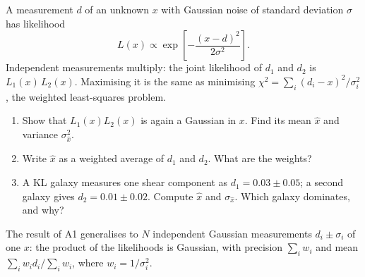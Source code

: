 
\begin{given}
A measurement $d$ of an unknown $x$ with Gaussian noise of standard deviation $\sigma$ has likelihood
\[
L(x) \propto \exp\!\left[-\frac{(x-d)^2}{2\sigma^2}\right].
\]
Independent measurements multiply: the joint likelihood of $d_1$ and $d_2$ is $L_1(x)\,L_2(x)$. Maximising it is the
same as minimising $\chi^2 = \sum_i (d_i - x)^2/\sigma_i^2$, the weighted least-squares problem.
\end{given}


\begin{enumerate}
  \item Show that $L_1(x)L_2(x)$ is again a Gaussian in $x$. Find its mean $\hat x$ and variance $\sigma_{\hat x}^2$.
  \item Write $\hat x$ as a weighted average of $d_1$ and $d_2$. What are the weights?
  \item A KL galaxy measures one shear component as $d_1 = 0.03 \pm 0.05$; a second galaxy gives $d_2 = 0.01 \pm 0.02$.
    Compute $\hat x$ and $\sigma_{\hat x}$. Which galaxy dominates, and why?
\end{enumerate}



\begin{given}
The result of A1 generalises to $N$ independent Gaussian measurements $d_i \pm \sigma_i$ of one $x$: the product of
the likelihoods is Gaussian, with precision $\sum_i w_i$ and mean $\sum_i w_i d_i / \sum_i w_i$, where
$w_i = 1/\sigma_i^2$.
\end{given}

